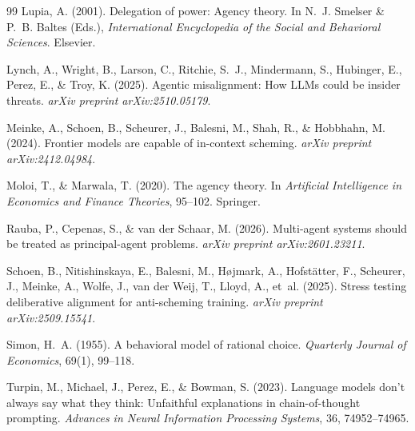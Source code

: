 \documentclass{article}
\begin{document}
\begin{thebibliography}{99}
Lupia, A. (2001). Delegation of power: Agency theory. In N.~J. Smelser \& P.~B. Baltes (Eds.), \emph{International Encyclopedia of the Social and Behavioral Sciences}. Elsevier.

Lynch, A., Wright, B., Larson, C., Ritchie, S.~J., Mindermann, S., Hubinger, E., Perez, E., \& Troy, K. (2025). Agentic misalignment: How LLMs could be insider threats. \emph{arXiv preprint arXiv:2510.05179}.

Meinke, A., Schoen, B., Scheurer, J., Balesni, M., Shah, R., \& Hobbhahn, M. (2024). Frontier models are capable of in-context scheming. \emph{arXiv preprint arXiv:2412.04984}.

Moloi, T., \& Marwala, T. (2020). The agency theory. In \emph{Artificial Intelligence in Economics and Finance Theories}, 95--102. Springer.

Rauba, P., Cepenas, S., \& van der Schaar, M. (2026). Multi-agent systems should be treated as principal-agent problems. \emph{arXiv preprint arXiv:2601.23211}.

Schoen, B., Nitishinskaya, E., Balesni, M., H{\o}jmark, A., Hofst{\"a}tter, F., Scheurer, J., Meinke, A., Wolfe, J., van der Weij, T., Lloyd, A., et~al. (2025). Stress testing deliberative alignment for anti-scheming training. \emph{arXiv preprint arXiv:2509.15541}.

Simon, H.~A. (1955). A behavioral model of rational choice. \emph{Quarterly Journal of Economics}, 69(1), 99--118.

Turpin, M., Michael, J., Perez, E., \& Bowman, S. (2023). Language models don't always say what they think: Unfaithful explanations in chain-of-thought prompting. \emph{Advances in Neural Information Processing Systems}, 36, 74952--74965.

\end{thebibliography}
\end{document}
